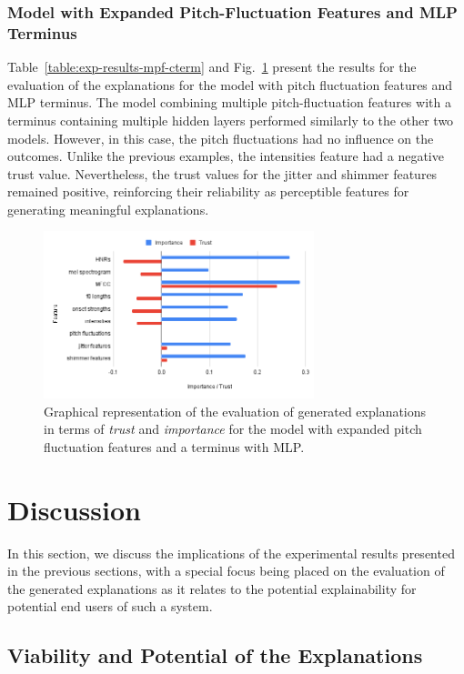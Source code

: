 \documentclass{article}
\begin{document}
\subsubsection{Model with Expanded Pitch-Fluctuation Features and MLP Terminus}
Table~\ref{table:exp-results-mpf-cterm} and Fig.~\ref{fig:exp_mpf_cterm} present the results for the evaluation of the explanations for the model with pitch fluctuation features and MLP terminus. The model combining multiple pitch-fluctuation features with a terminus containing multiple hidden layers performed similarly to the other two models. However, in this case, the pitch fluctuations had no influence on the outcomes. Unlike the previous examples, the intensities feature had a negative trust value. Nevertheless, the trust values for the jitter and shimmer features remained positive, reinforcing their reliability as perceptible features for generating meaningful explanations.
		\begin{figure}
			\centering
			\includegraphics[width=0.7\textwidth]{images/exp_mpf_cterm.png}
			\caption{Graphical representation of the evaluation of generated explanations in terms of \textit{trust} and \textit{importance} for the model with expanded pitch fluctuation features and a terminus with MLP.}
			\label{fig:exp_mpf_cterm}
		\end{figure}

\section{Discussion}\label{sec:discussion}
In this section, we discuss the implications of the experimental results presented in the previous sections, with a special focus being placed on the evaluation of the generated explanations as it relates to the potential explainability for potential end users of such a system.
		
\subsection{Viability and Potential of the Explanations}
\end{document}
